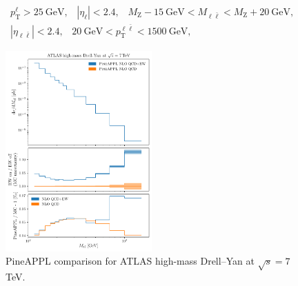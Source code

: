 \begin{equation}
\begin{gathered}
p_\mathrm{T}^\ell > \SI{25}{\giga\electronvolt} \text{,} \quad |\eta_\ell| < 2.4 \text{,} \quad M_\mathrm{Z} - \SI{15}{\giga\electronvolt} < M_{\ell \bar{\ell}} < M_\mathrm{Z} + \SI{20}{\giga\electronvolt} \text{,} \\
|\eta_{\ell \bar{\ell}}| < 2.4 \text{,} \quad \SI{20}{\giga\electronvolt} < p_\mathrm{T}^{\ell \bar{\ell}} < \SI{1500}{\giga\electronvolt} \text{,}
\end{gathered}
\end{equation}

\begin{figure}
    \centering
    \includegraphics[width=0.5\textwidth]{figures/pineappl_ATLASZHIGHMASS49FB}
    \caption{PineAPPL comparison for ATLAS high-mass Drell--Yan at $\sqrt{s}=7$ TeV.}
    \label{fig:atlaszhighmass49fb}
\end{figure}

